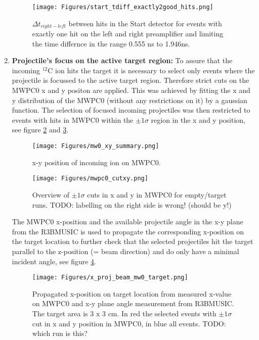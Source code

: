 \begin{enumerate}
\begin{figure}
\centering
\texttt{[image: Figures/start\_tdiff\_exactly2good\_hits.png]}
\caption{$\Delta t_{right-left}$ between hits in the Start detector for events with exactly one hit on the left and right preamplifier and limiting the time differnce in the range 0.555 ns to 1.946ns.}
\label{fig:start_good_event_sel}
\end{figure}
\item \textbf{Projectile's focus on the active target region:}\newline
To assure that the incoming $^{12}$C ion hits the target it is necessary to select only events where the projectile is focussed to the active target region. Therefore strict cuts on the MWPC0 x and y positon are applied. This was achieved by fitting the x and y distribution of the MWPC0 (without any restrictions on it) by a gaussian function. The selection of focused incoming projectiles was then restricted to events with hits in MWPC0 within the $\pm 1\sigma$ region in the x and y position, see figure \ref{fig:mw0_xy_overview} and \ref{fig:mw0_cuts}.\newline
\begin{figure}
\centering
\texttt{[image: Figures/mw0\_xy\_summary.png]}
\caption{x-y position of incoming ion on MWPC0.}
\label{fig:mw0_xy_overview}
\end{figure}
\begin{figure}
\centering
\texttt{[image: Figures/mwpc0\_cutxy.png]}
\caption{Overview of $\pm 1\sigma$ cuts in x and y in MWPC0 for empty/target runs. TODO: labelling on the right side is wrong! (should be y!)}
\label{fig:mw0_cuts}
\end{figure}
The MWPC0 x-position and the available projectile angle in the x-y plane from the R3BMUSIC is used to propagate the corresponding x-position on the target location to further check that the selected projectiles hit the target parallel to the z-position (= beam direction) and do only have a minimal incident angle, see figure \ref{fig:x_pos_target}. 
\begin{figure}[htpb]
    \centering
    \texttt{[image: Figures/x\_proj\_beam\_mw0\_target.png]}
    \caption{
   	Propagated x-position on target location from measured x-value on MWPC0 and x-y plane angle measurement from R3BMUSIC. The target area is 3 x 3 cm. In red the selected events with $\pm 1\sigma$ cut in x and y position in MWPC0, in blue all events. TODO: which run is this?
    }
    \label{fig:x_pos_target}
\end{figure}
\end{enumerate}
